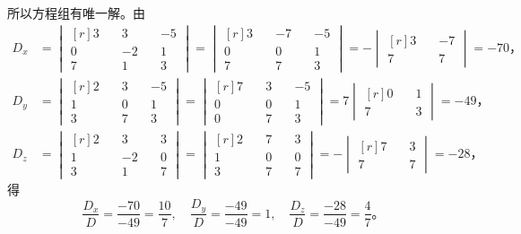 所以方程组有唯一解。由
\begin{align*}
    D_x &= \begin{vmatrix*}[r]
            3 \quad & 3  \quad & -5 \\
            0 \quad & -2 \quad & 1 \\
            7 \quad & 1  \quad & 3
        \end{vmatrix*} = \begin{vmatrix*}[r]
            3 \quad & -7 \quad & -5 \\
            0 \quad & 0  \quad & 1 \\
            7 \quad & 7  \quad & 3
        \end{vmatrix*} = - \begin{vmatrix*}[r]
            3 \quad & -7 \\
            7 \quad & 7
        \end{vmatrix*} = -70 \text{，} \\
    D_y &= \begin{vmatrix*}[r]
            2 \quad & 3 \quad & -5 \\
            1 \quad & 0 \quad & 1 \\
            3 \quad & 7 \quad & 3
        \end{vmatrix*} = \begin{vmatrix*}[r]
            7 \quad & 3 \quad & -5 \\
            0 \quad & 0 \quad & 1 \\
            0 \quad & 7 \quad & 3
        \end{vmatrix*} = 7 \begin{vmatrix*}[r]
            0 \quad & 1 \\
            7 \quad & 3
        \end{vmatrix*} = -49 \text{，} \\
    D_z &= \begin{vmatrix*}[r]
            2 \quad & 3  \quad & 3 \\
            1 \quad & -2 \quad & 0 \\
            3 \quad & 1  \quad & 7
        \end{vmatrix*} = \begin{vmatrix*}[r]
            2 \quad & 7 \quad & 3 \\
            1 \quad & 0 \quad & 0 \\
            3 \quad & 7 \quad & 7
        \end{vmatrix*} = - \begin{vmatrix*}[r]
            7 \quad & 3 \\
            7 \quad & 7
        \end{vmatrix*} = -28 \text{，}
\end{align*}
得
$$
    \dfrac{D_x}{D} = \dfrac{-70}{-49} = \dfrac{10}{7},\quad
    \dfrac{D_y}{D} = \dfrac{-49}{-49} = 1,\quad
    \dfrac{D_z}{D} = \dfrac{-28}{-49} = \dfrac{4}{7} \text{。}
$$

